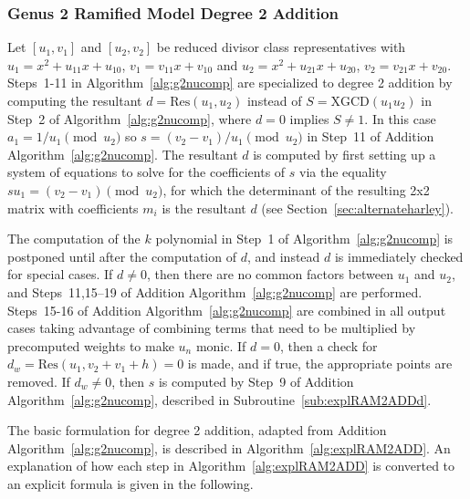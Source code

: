 \subsubsection{Genus 2 Ramified Model Degree 2 Addition}
Let $[u_1,v_1]$ and $[u_2,v_2]$ be reduced divisor class representatives with
$u_1 = x^2 + u_{11}x + u_{10}$, $v_1 = v_{11}x + v_{10}$ and $u_2 = x^2 +
u_{21}x + u_{20}$, $v_2 = v_{21}x + v_{20}$. Steps~1-11 in
Algorithm~\ref{alg:g2nucomp} are specialized to degree 2 addition by computing
the resultant $d = \mathrm{Res}(u_1,u_2)$ instead of $S = \mathrm{XGCD}(u_1
u_2)$ in Step~2 of Algorithm~\ref{alg:g2nucomp}, where $d=0$ implies $S
\neq 1$. In this case $a_1 = 1/u_1 \pmod{u_2}$ so $s = (v_2 - v_1)/u_1
\pmod{u_2}$ in Step~11 of Addition Algorithm~\ref{alg:g2nucomp}. The resultant
$d$ is computed by first setting up a system of equations to solve for the
coefficients of $s$ via the equality $su_1 = (v_2 - v_1) \pmod{u_2}$, for which the
determinant of the resulting 2x2 matrix with coefficients $m_i$ is the resultant
$d$ (see Section~\ref{sec:alternateharley}).

The computation of the $k$ polynomial in Step~1 of Algorithm~\ref{alg:g2nucomp}
is postponed until after the computation of $d$, and instead $d$ is immediately
checked for special cases. If $d \neq 0$, then there are no common factors
between $u_1$ and $u_2$, and Steps~11,15--19 of Addition
Algorithm~\ref{alg:g2nucomp} are performed. Steps~15-16 of Addition
Algorithm~\ref{alg:g2nucomp} are combined in all output cases taking advantage
of combining terms that need to be multiplied by precomputed weights to make
$u_n$ monic. If $d = 0$, then a check for $d_w = \mathrm{Res}(u_1,v_2 + v_1 + h)
= 0$ is made, and if true, the appropriate points are removed. If $d_w \neq
0$, then $s$ is computed by Step~9 of Addition Algorithm~\ref{alg:g2nucomp},
described in Subroutine~\ref{sub:explRAM2ADDd}. 

The basic formulation for degree 2 addition, adapted from Addition
Algorithm~\ref{alg:g2nucomp}, is described in Algorithm~\ref{alg:explRAM2ADD}.
An explanation of how each step in Algorithm~\ref{alg:explRAM2ADD} is converted
to an explicit formula is given in the following.



